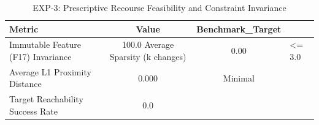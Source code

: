 \begin{table}[htbp]
\centering
\caption{EXP-3: Prescriptive Recourse Feasibility and Constraint Invariance}
\label{tab:exp3_recourse_feasibility}
\begin{tabular}{lcc}
\toprule
Metric & Value & Benchmark\_Target \\
\midrule
Immutable Feature (F17) Invariance & 100.0%
Average Sparsity (k changes) & 0.00 & <= 3.0 \\
Average L1 Proximity Distance & 0.000 & Minimal \\
Target Reachability Success Rate & 0.0%
\bottomrule
\end{tabular}
\end{table}
